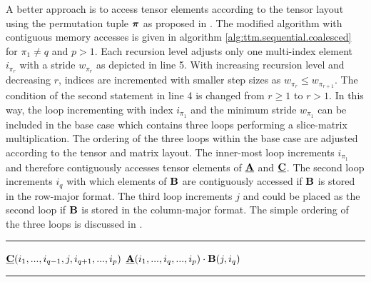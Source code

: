 A better approach is to access tensor elements according to the tensor layout using the permutation tuple $\boldsymbol{\pi}$ as proposed in \cite{bassoy:2018:fast}.
The modified algorithm with contiguous memory accesses is given in algorithm \ref{alg:ttm.sequential.coalesced} for $\pi_1 \neq q$ and $p > 1$.
Each recursion level adjusts only one multi-index element $i_{\pi_r}$ with a stride $w_{\pi_r}$ as depicted in line 5.
With increasing recursion level and decreasing $r$, indices are incremented with smaller step sizes as $w_{\pi_r} \leq w_{\pi_{r+1}}$. 
The condition of the second  statement in line 4 is changed from $r \geq 1$ to $r > 1$.
In this way, the loop incrementing with index $i_{\pi_1}$ and the minimum stride $w_{\pi_1}$ can be included in the base case which contains three loops performing a slice-matrix multiplication. 
The ordering of the three loops within the base case are adjusted according to the tensor and matrix layout.
The inner-most loop increments $i_{\pi_1}$ and therefore contiguously accesses tensor elements of $\mubA$ and $\mubC$.
The second loop increments $i_q$ with which elements of $\mathbf{B}$ are contiguously accessed if $\mathbf{B}$ is stored in the row-major format.
The third loop increments $j$ and could be placed as the second loop if $\mathbf{B}$ is stored in the column-major format.
The simple ordering of the three loops is discussed in \cite{golub:2013:matrix.computations}.

\begin{algorithm}[t]
\DontPrintSemicolon
{}
%
\footnotesize 
\SetAlgoVlined
\hrule
\BlankLine
{}
{
	{
	}
	{
		{
			\;
		}		
	}	
	\Else%
	{
		{
			{			
				{
					$\underline{\mathbf{C}}(i_1,...,i_{q-1},j,i_{q+1},...,i_{p})$ \ttt{+=} $\underline{\mathbf{A}}(i_1,...,i_q,...,i_p) \cdot \mathbf{B}(j,i_q)$\;
				}
			}
		}
	}
}
\BlankLine
\hrule
\caption{
\footnotesize %
Modified baseline algorithm with contiguous memory access for the tensor-matrix multiplication.
The tensor order must be greater than one and for the contraction mode $1 \leq q \leq p$ and $\pi_1 \neq q$ must hold.
The algorithm needs to be initially called with $r=p$ where $\mbn$ is the shape tuple of $\mubA$ and $m$ is the $q$-th dimension of $\mubC$. 
\label{alg:ttm.sequential.coalesced}
}
\end{algorithm}

